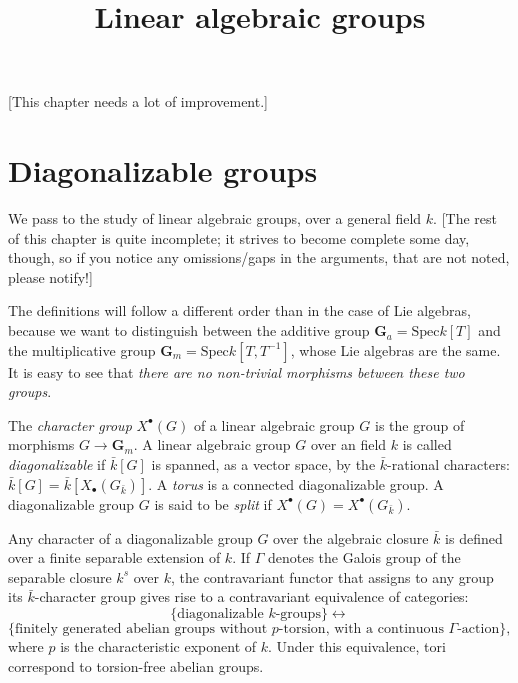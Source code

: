 

%


\title{Linear algebraic groups}


\maketitle

\label{section-phantom}

\tableofcontents

[This chapter needs a lot of improvement.]

\section{Diagonalizable groups}
\label{section-diagonalizable-groups}

We pass to the study of linear algebraic groups, over a general field $k$. [The rest of this chapter is quite incomplete; it strives to become complete some day, though, so if you notice any omissions/gaps in the arguments, that are not noted, please notify!]


The definitions will follow a different order than in the case of Lie algebras, because we want to distinguish between the additive group $\mathbf G_a = \text{Spec} k[T]$ and the multiplicative group $\mathbf G_m = \text{Spec} k[T,T^{-1}]$, whose Lie algebras are the same. It is easy to see that \emph{there are no non-trivial morphisms between these two groups}. 


\begin{definition}
\label{definition-characters-diagonalizable-group} 
The {\it character group} $X^\bullet(G)$ of a linear algebraic group $G$ is the group of morphisms $G\to \mathbf G_m$. 
A linear algebraic group $G$ over an field $k$ is called \emph{diagonalizable} if $\bar k[G]$ is spanned, as a vector space, by the $\bar k$-rational characters: $\bar k[G] = \bar k[X_\bullet(G_{\bar k})]$. A {\it torus} is a connected diagonalizable group. A diagonalizable group $G$ is said to be {\it split} if $X^\bullet(G) = X^\bullet(G_{\bar k})$.
\end{definition}

\begin{theorem}
\label{theorem-diagonalizable-equivalence}
Any character of a diagonalizable group $G$ over the algebraic closure $\bar k$ is defined over a finite separable extension of $k$. If $\Gamma$ denotes the Galois group of the separable closure $k^s$ over $k$, the contravariant functor that assigns to any group its $\bar k$-character group gives rise to a contravariant equivalence of categories:
$$\{\mbox{diagonalizable $k$-groups}\} \leftrightarrow $$
$$\{\mbox{finitely generated abelian groups without $p$-torsion, with a continuous $\Gamma$-action}\},$$
where $p$ is the characteristic exponent of $k$.
Under this equivalence, tori correspond to torsion-free abelian groups.
\end{theorem}

